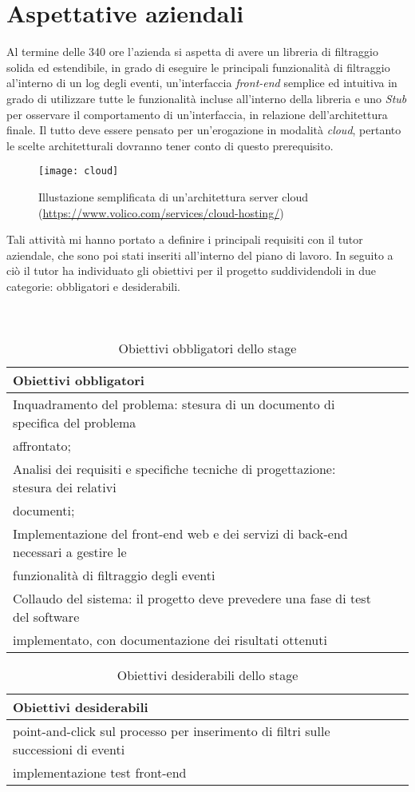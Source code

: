 \section{Aspettative aziendali}
Al termine delle 340 ore l'azienda si aspetta di avere un libreria di filtraggio solida ed estendibile, in grado di eseguire le principali funzionalità di filtraggio al'interno di un log degli eventi, un'interfaccia \textit{front-end} semplice ed intuitiva in grado di utilizzare tutte le funzionalità incluse all'interno della libreria e uno \textit{Stub} per osservare il comportamento di un'interfaccia, in relazione dell'architettura finale.
Il tutto deve essere pensato per un’erogazione in modalità \textit{cloud}, pertanto le scelte architetturali dovranno tener conto di questo prerequisito.
\begin{figure}[!h] 
	\centering 
	\texttt{[image: cloud]} 
	\caption{Illustazione semplificata di un'architettura server cloud (\url{https://www.volico.com/services/cloud-hosting/})}
\end{figure}
Tali attività mi hanno portato a definire i principali requisiti con il tutor aziendale, che sono poi stati inseriti all'interno del piano di lavoro. In seguito a ciò il tutor ha individuato gli obiettivi per il progetto suddividendoli in due categorie: obbligatori e desiderabili.\\
\\
\\
\begin{table}[!h]
	\caption{Obiettivi obbligatori dello stage}
\begin{tabularx}{\textwidth}{lXl}
	\hline\hline
	\textbf{Obiettivi obbligatori}\\
	\hline
	Inquadramento del problema: stesura di un documento di specifica del problema\\
	affrontato; &  \\
	\hline
	\hline
     Analisi dei requisiti e specifiche tecniche di progettazione: stesura dei relativi\\
     documenti; &  \\
	\hline
	\hline
	Implementazione del front-end web e dei servizi di back-end necessari a gestire le\\
	funzionalità di filtraggio degli eventi &  \\
	\hline
	\hline
	Collaudo del sistema: il progetto deve prevedere una fase di test del software\\
	implementato, con documentazione dei risultati ottenuti &  \\
	\hline	
\end{tabularx}
\end{table}
\begin{table}[!h]
	\caption{Obiettivi desiderabili dello stage}
	\begin{tabularx}{\textwidth}{lXl}
		\hline\hline
		\textbf{Obiettivi desiderabili}\\
		\hline
		point-and-click sul processo per inserimento di filtri sulle successioni di eventi&  \\
		\hline
		\hline
		implementazione test front-end &  \\
		\hline
	\end{tabularx}
\end{table}
